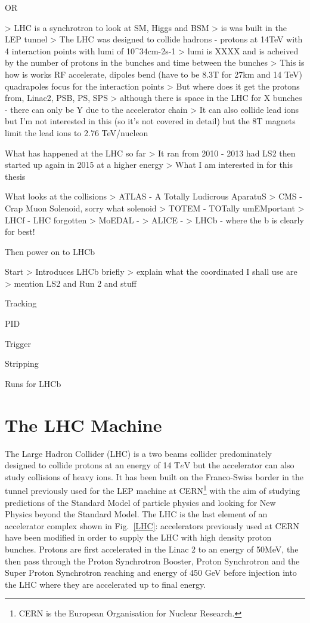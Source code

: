 OR

> LHC is a synchrotron to look at SM, Higgs and BSM
> is was built in the LEP tunnel
> The LHC was designed to collide hadrons - protons at 14TeV with 4 interaction points with lumi of 10^34cm-2s-1
> lumi is XXXX and is acheived by the number of protons in the bunches and time between the bunches
> This is how is works RF accelerate, dipoles bend (have to be 8.3T for 27km and 14 TeV) quadrapoles focus for the interaction points
> But where does it get the protons from, Linac2, PSB, PS, SPS
> although there is space in the LHC for X bunches - there can only be Y due to the accelerator chain
> It can also collide lead ions but I'm not interested in this (so it's not covered in detail) but the 8T magnets limit the lead ions to 2.76 TeV/nucleon

What has happened at the LHC so far
> It ran from 2010 - 2013 had LS2 then started up again in 2015 at a higher energy
> What I am interested in for this thesis


What looks at the collisions
> ATLAS  - A Totally Ludicrous AparatuS
> CMS - Crap Muon Solenoid, sorry what solenoid
> TOTEM - TOTally umEMportant
> LHCf - LHC forgotten
> MoEDAL - 
> ALICE - 
> LHCb - where the b is clearly for best!



Then power on to LHCb

Start
> Introduces LHCb briefly
> explain what the coordinated I shall use are
> mention LS2 and Run 2 and stuff

Tracking

PID

Trigger

Stripping

Runs for LHCb







\section{The LHC Machine}

The Large Hadron Collider (LHC) \cite{LHC} is a two beams collider predominately designed to collide protons at an energy of 14 T$e$V but the accelerator can also study collisions of heavy ions. 
It has been built on the Franco-Swiss border in the tunnel previously used for the LEP machine at CERN\footnote{CERN is the 
European Organisation for Nuclear Research.} with the aim of studying predictions of the Standard Model of particle physics and looking for New Physics beyond the
Standard Model. The LHC is the last element of an
accelerator complex shown in Fig.~\ref{LHC}: accelerators previously used at CERN have been modified in order to supply the LHC with high density proton bunches. Protons are first accelerated in the Linac 2 to an energy of 50MeV, 
the then pass through the Proton Synchrotron Booster, Proton Synchrotron and the Super Proton Synchrotron reaching and energy of 450 GeV before injection into the LHC where they are accelerated
up to final energy. 


